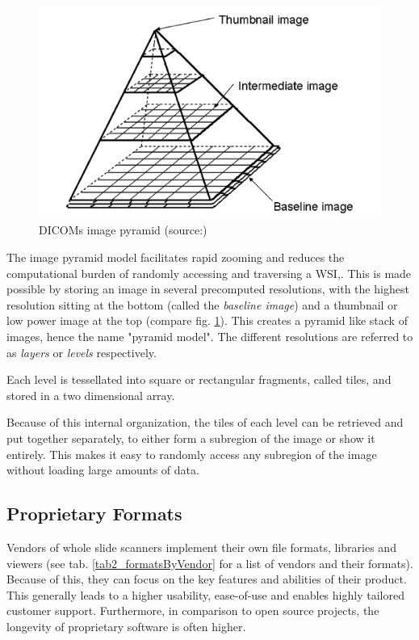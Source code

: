 \begin{figure}[H]
	\begin{center}
		\includegraphics[scale=0.2]{img/imgPyramid.png}
		\caption{DICOMs image pyramid (source:\cite{Singh11})}
		\label{fig2_pyramid}
	\end{center}
\end{figure}

The image pyramid model facilitates rapid zooming and reduces the computational burden of randomly accessing and traversing a WSI\cite{Singh11},\cite{Park12}. This is made possible by storing an image in several precomputed resolutions, with the highest resolution sitting at the bottom (called the \emph{baseline image}) and a thumbnail or low power image at the top (compare fig. \ref{fig2_pyramid})\cite{DICOM10}. This creates a pyramid like stack of images, hence the name "pyramid model". The different resolutions are referred to as \emph{layers}\cite{DICOM10} or \emph{levels}\cite{Singh11} respectively.

Each level is tessellated into square or rectangular fragments, called tiles, and stored in a two dimensional array\cite{Farahanil15}. 

Because of this internal organization, the tiles of each level can be retrieved and put together separately, to either form a subregion of the image or show it entirely. This makes it easy to randomly access any subregion of the image without loading large amounts of data\cite{Singh11}.


\subsection{Proprietary Formats}
\label{sec2_proprietaryForams}
Vendors of whole slide scanners implement their own file formats, libraries and viewers (see tab. \ref{tab2_formatsByVendor} for a list of vendors and their formats). Because of this, they can focus on the key features and abilities of their product. This generally leads to a higher usability, ease-of-use and enables highly tailored customer support. Furthermore, in comparison to open source projects, the longevity of proprietary software is often higher\cite{Optimus15}.

